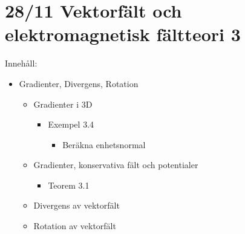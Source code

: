 \section{28/11 \quad Vektorfält och elektromagnetisk fältteori \quad \textcircled{3}}

Innehåll:
\begin{itemize}[label=--]
  \item Gradienter, Divergens, Rotation
  \begin{itemize}[label=+]
    \item Gradienter i 3D
    \begin{itemize}[label=--]
      \item Exempel 3.4
      \begin{itemize}[label=+]
        \item Beräkna enhetsnormal
      \end{itemize}
    \end{itemize}
    \item Gradienter, konservativa fält och potentialer
    \begin{itemize}[label=--]
      \item Teorem 3.1
    \end{itemize}
    \item Divergens av vektorfält
    \item Rotation av vektorfält
  \end{itemize}
\end{itemize}
